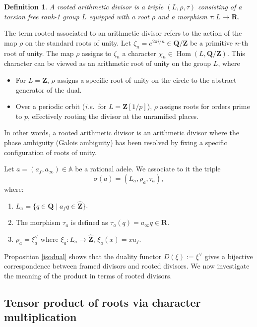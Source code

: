 \documentclass[11pt,a4paper]{article}
\newcommand{\Q}{\mathbf{Q}}
\newcommand{\Z}{\mathbf{Z}}
\newcommand{\R}{\mathbf{R}}
\newcommand{\A}{\mathbb{A}}
\def\ie{{\it i.e.\/}\ }
\theoremstyle{plain}
\newtheorem{defn}[thm]{Definition}
\theoremstyle{definition} %
\begin{document}
\begin{defn}
A \emph{rooted arithmetic divisor} is a triple $(L, \rho, \tau)$ consisting of a torsion free rank-1 group $L$ equipped with a root $\rho$ and a morphism $\tau:L\to \R$.
\end{defn}



The term rooted associated to an arithmetic divisor  refers to the action of the map $\rho$ on the standard roots of unity. 
Let $\zeta_n = e^{2\pi i / n} \in \Q/\Z$ be a primitive $n$-th root of unity.
The map $\rho$ assigns to $\zeta_n$ a character $\chi_n \in \operatorname{Hom}(L, \Q/\Z)$.
This character can be viewed as an arithmetic root of unity on the group $L$, where
\begin{itemize}[leftmargin=*, labelindent=0pt]
    \item[] For $L=\Z$, $\rho$ assigns a specific root of unity on the circle to the abstract generator of the dual.
    \item[] Over a periodic orbit (\ie for $L=\Z[1/p]$), $\rho$ assigns roots for orders prime to $p$, effectively rooting the divisor at the unramified places.
\end{itemize}

In other words, a rooted arithmetic divisor is an arithmetic divisor where the phase ambiguity (Galois ambiguity) has been resolved by fixing a specific configuration of roots of unity.\vspace{.08in}

Let $a = (a_f, a_\infty) \in \A$ be a rational adele. We associate to it the triple 
\begin{equation}\label{tau}
\sigma(a)=(L_a, \rho_a, \tau_a),
\end{equation}
where:
\begin{enumerate}
    \item $L_a = \{ q \in \Q \mid a_f q \in \widehat{\Z} \}$.
    \item The morphism $\tau_a$ is defined as $\tau_a(q) = a_\infty q\in \R$.
    \item $\rho_a=\xi_a^\vee$ where $\xi_a: L_a\to \widehat{\Z}$,    $\xi_a(x) = x a_f$.
\end{enumerate}
Proposition \ref{isodual} shows that the duality functor $D(\xi):=\xi^\vee$ gives a bijective correspondence between framed divisors and rooted divisors. We now investigate the meaning of the product in terms of rooted divisors.



\subsection{Tensor product of roots via character multiplication}
\end{document}
